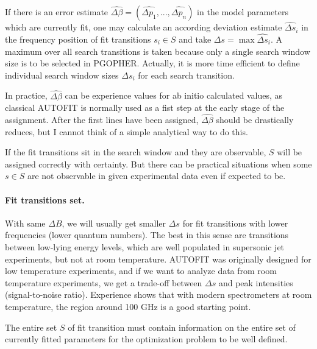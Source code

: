 \documentclass[11pt]{article}
\begin{document}
If there is an error estimate $\widehat {\Delta \beta} = (\widehat {\Delta p_1}, ..., \widehat {\Delta p_n})$ in the model parameters which are currently fit, one may calculate an according deviation estimate $\widehat {\Delta s}_i$ in the frequency position of fit transitions  $s_i \in S$ and take $\Delta s = \max \widehat {\Delta s}_i$. %
A maximum over all search transitions is taken because only a single search window size is to be selected in PGOPHER. Actually, it is more time efficient to define individual search window sizes $\Delta s_i$ for each search transition.


In practice, $\widehat {\Delta \beta}$ can be experience values for ab initio calculated values, as classical AUTOFIT is normally used as a fist step at the early stage of the assignment. After the first lines have been assigned, $\widehat {\Delta \beta}$ should be drastically reduces, but I cannot think of a simple analytical way to do this.

If the fit transitions sit in the search window and they are observable, $S$ will be assigned correctly with certainty. But there can be practical situations when some $s \in S$ are not observable in given experimental data even if expected to be.

\paragraph{Fit transitions set.}

With same $\Delta B$, we will usually get smaller $\Delta s$ for fit transitions with lower frequencies (lower quantum numbers). The best in this sense are transitions between low-lying energy levels, which are well populated in supersonic jet experiments, but not at room temperature. AUTOFIT was originally designed for low temperature experiments, and if we want to analyze data from room temperature experiments, we get a trade-off between $\Delta s$ and peak intensities (signal-to-noise ratio). Experience shows that with modern spectrometers at room temperature, the region around 100 GHz is a good starting point. 

The entire set $S$ of fit transition must contain information on the entire set of currently fitted parameters for the optimization problem to be well defined.
\end{document}
